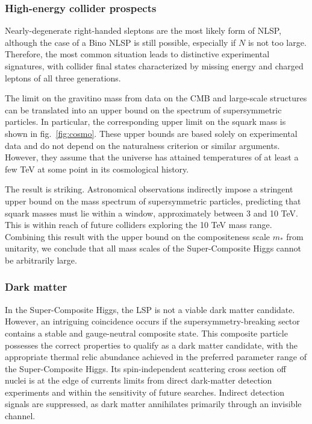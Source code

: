 \documentclass[a4paper,12pt]{article}
\def\fig#1{fig.~\ref{#1}}
\def\fig#1{fig.~\ref{#1}}
\def\mst{m_*}
\begin{document}
{{{{\subsubsection*{High-energy collider prospects}

Nearly-degenerate right-handed sleptons are the most likely form of NLSP, although the case of a Bino NLSP is still possible, especially if $N$ is not too large. Therefore, the most common situation leads to  distinctive experimental signatures, with collider final states characterized by missing energy and charged leptons of all three generations.  

The limit on the gravitino mass from data on the CMB and large-scale structures can be translated into an upper bound on the spectrum of supersymmetric particles. In particular, the corresponding upper limit on the squark mass is shown in \fig{fig:cosmo}. These upper bounds are based solely on experimental data and do not depend on the naturalness criterion or similar arguments. However, they assume that the universe has attained temperatures of at least a few TeV at some point in its cosmological history.  

The result is striking. Astronomical observations indirectly impose a stringent upper bound on the mass spectrum of supersymmetric particles, predicting that squark masses must lie within a window, approximately between 3 and 10 TeV.  This is within reach of future colliders exploring the 10 TeV mass range. Combining this result with the upper bound on the compositeness scale $\mst$ from unitarity, we conclude that all mass scales of the Super-Composite Higgs cannot be arbitrarily large. 

\subsubsection*{Dark matter}

In the Super-Composite Higgs, the LSP is not a viable dark matter candidate.
However, an intriguing coincidence occurs if the supersymmetry-breaking sector contains a stable and gauge-neutral composite state. This composite particle possesses the correct properties to qualify as a dark matter candidate, with the appropriate thermal relic abundance achieved in the preferred parameter range of the Super-Composite Higgs. Its spin-independent scattering cross section off nuclei is at the edge of currents limits from direct dark-matter detection experiments and within the sensitivity of future searches. Indirect detection signals are suppressed, as dark matter annihilates primarily through an invisible channel.

}}}}
\end{document}
